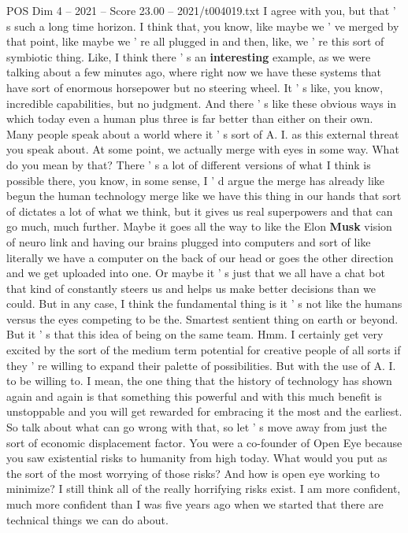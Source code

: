 \begin{textsample}{POS Dim 4 – 2021 – Score 23.00 – 2021/t004019.txt}
I agree with you, but that ' s such a long time horizon.
I think that, you know, like maybe we ' ve merged by that point, like maybe we ' re all plugged in and then, like, we ' re this sort of symbiotic thing.
Like, I think there ' s an \textbf{interesting} example, as we were talking about a few minutes ago, where right now we have these systems that have sort of enormous horsepower but no steering wheel.
It ' s like, you know, incredible capabilities, but no judgment.
And there ' s like these obvious ways in which today even a human plus three is far better than either on their own.
Many people speak about a world where it ' s sort of A.
I. as this external threat you speak about.
At some point, we actually merge with eyes in some way.
What do you mean by that?
There ' s a lot of different versions of what I think is possible there, you know, in some sense, I ' d argue the merge has already like begun the human technology merge like we have this thing in our hands that sort of dictates a lot of what we think, but it gives us real superpowers and that can go much, much further.
Maybe it goes all the way to like the Elon \textbf{Musk} vision of neuro link and having our brains plugged into computers and sort of like literally we have a computer on the back of our head or goes the other direction and we get uploaded into one.
Or maybe it ' s just that we all have a chat bot that kind of constantly steers us and helps us make better decisions than we could.
But in any case, I think the fundamental thing is it ' s not like the humans versus the eyes competing to be the.
Smartest sentient thing on earth or beyond.
But it ' s that this idea of being on the same team.
Hmm.
I certainly get very excited by the sort of the medium term potential for creative people of all sorts if they ' re willing to expand their palette of possibilities.
But with the use of A.
I. to be willing to.
I mean, the one thing that the history of technology has shown again and again is that something this powerful and with this much benefit is unstoppable and you will get rewarded for embracing it the most and the earliest.
So talk about what can go wrong with that, so let ' s move away from just the sort of economic displacement factor.
You were a co-founder of Open Eye because you saw existential risks to humanity from high today.
What would you put as the sort of the most worrying of those risks?
And how is open eye working to minimize?
I still think all of the really horrifying risks exist.
I am more confident, much more confident than I was five years ago when we started that there are technical things we can do about.

\end{textsample}
